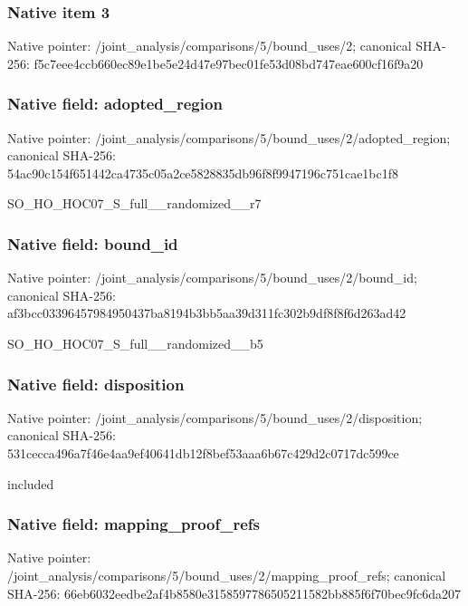 \documentclass[10pt,a4paper]{article}
\begin{document}
\subsubsection{Native item 3}
Native pointer: /joint\_\allowbreak{}analysis/comparisons/5/bound\_\allowbreak{}uses/2; canonical SHA-256: f5c7eee4ccb660ec89e1be5e24d47e97bec01fe53d08bd747eae600cf16f9a20

\subsubsection{Native field: adopted\_\allowbreak{}region}
Native pointer: /joint\_\allowbreak{}analysis/comparisons/5/bound\_\allowbreak{}uses/2/adopted\_\allowbreak{}region; canonical SHA-256: 54ac90c154f651442ca4735c05a2ce5828835db96f8f9947196c751cae1bc1f8

\begingroup\raggedright\sloppy SO\_\allowbreak{}HO\_\allowbreak{}HOC07\_\allowbreak{}S\_\allowbreak{}full\_\allowbreak{}\_\allowbreak{}randomized\_\allowbreak{}\_\allowbreak{}r7\par\endgroup

\subsubsection{Native field: bound\_\allowbreak{}id}
Native pointer: /joint\_\allowbreak{}analysis/comparisons/5/bound\_\allowbreak{}uses/2/bound\_\allowbreak{}id; canonical SHA-256: af3bcc03396457984950437ba8194b3bb5aa39d311fc302b9df8f8f6d263ad42

\begingroup\raggedright\sloppy SO\_\allowbreak{}HO\_\allowbreak{}HOC07\_\allowbreak{}S\_\allowbreak{}full\_\allowbreak{}\_\allowbreak{}randomized\_\allowbreak{}\_\allowbreak{}b5\par\endgroup

\subsubsection{Native field: disposition}
Native pointer: /joint\_\allowbreak{}analysis/comparisons/5/bound\_\allowbreak{}uses/2/disposition; canonical SHA-256: 531cecca496a7f46e4aa9ef40641db12f8bef53aaa6b67c429d2c0717dc599ce

\begingroup\raggedright\sloppy included\par\endgroup

\subsubsection{Native field: mapping\_\allowbreak{}proof\_\allowbreak{}refs}
Native pointer: /joint\_\allowbreak{}analysis/comparisons/5/bound\_\allowbreak{}uses/2/mapping\_\allowbreak{}proof\_\allowbreak{}refs; canonical SHA-256: 66eb6032eedbe2af4b8580e3158597786505211582bb885f6f70bec9fc6da207
\end{document}
